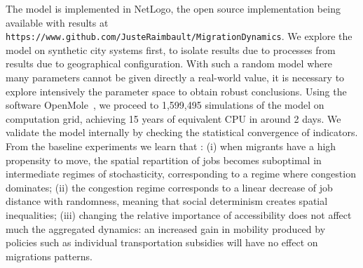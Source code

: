 The model is implemented in NetLogo, the open source implementation being available with results at \texttt{https://www.github.com/JusteRaimbault/MigrationDynamics}. We explore the model on synthetic city systems first, to isolate results due to processes from results due to geographical configuration. With such a random model where many parameters cannot be given directly a real-world value, it is necessary to explore intensively the parameter space to obtain robust conclusions. Using the software OpenMole~\cite{reuillon2013openmole}, we proceed to 1,599,495 simulations of the model on computation grid, achieving 15 years of equivalent CPU in around 2 days. We validate the model internally by checking the statistical convergence of indicators. From the baseline experiments we learn that : (i) when migrants have a high propensity to move, the spatial repartition of jobs becomes suboptimal in intermediate regimes of stochasticity, corresponding to a regime where congestion dominates; %
 (ii) the congestion regime corresponds to a linear decrease of job distance with randomness, meaning that social determinism creates spatial inequalities; %
 (iii) changing the relative importance of accessibility does not affect much the aggregated dynamics: an increased gain in mobility produced by policies such as individual transportation subsidies will have no effect on migrations patterns.%
